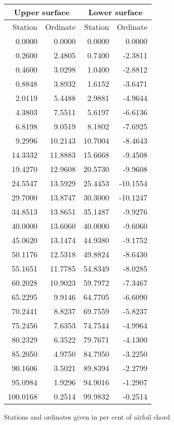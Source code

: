 \documentclass[11pt]{book}
\begin{document}
 \hspace{4mm}
 \begin{tabular}{|r|r|r|r|} \hline 
 \multicolumn{2}{|c|}{Upper surface} & \multicolumn{2}{|c|}{Lower surface} \\
 \hline
 Station & Ordinate & Station & Ordinate \\
 \hline
0.0000 & 0.0000 & 0.0000 & 0.0000 \\
0.2600 & 2.4805 & 0.7400 & -2.3811 \\
0.4600 & 3.0298 & 1.0400 & -2.8812 \\
0.8848 & 3.8932 & 1.6152 & -3.6471 \\
2.0119 & 5.4488 & 2.9881 & -4.9644 \\
4.3803 & 7.5511 & 5.6197 & -6.6136 \\
6.8198 & 9.0519 & 8.1802 & -7.6925 \\
9.2996 & 10.2143 & 10.7004 & -8.4643 \\
14.3332 & 11.8883 & 15.6668 & -9.4508 \\
19.4270 & 12.9608 & 20.5730 & -9.9608 \\
24.5547 & 13.5929 & 25.4453 & -10.1554 \\
29.7000 & 13.8747 & 30.3000 & -10.1247 \\
34.8513 & 13.8651 & 35.1487 & -9.9276 \\
40.0000 & 13.6060 & 40.0000 & -9.6060 \\
45.0620 & 13.1474 & 44.9380 & -9.1752 \\
50.1176 & 12.5318 & 49.8824 & -8.6430 \\
55.1651 & 11.7785 & 54.8349 & -8.0285 \\
60.2028 & 10.9023 & 59.7972 & -7.3467 \\
65.2295 & 9.9146 & 64.7705 & -6.6090 \\
70.2441 & 8.8237 & 69.7559 & -5.8237 \\
75.2456 & 7.6353 & 74.7544 & -4.9964 \\
80.2329 & 6.3522 & 79.7671 & -4.1300 \\
85.2050 & 4.9750 & 84.7950 & -3.2250 \\
90.1606 & 3.5021 & 89.8394 & -2.2799 \\
95.0984 & 1.9296 & 94.9016 & -1.2907 \\
100.0168 & 0.2514 & 99.9832 & -0.2514 \\
 \hline 
 \end{tabular}
 \vspace{8mm}

Stations and ordinates given in per cent of airfoil chord
\end{document}
